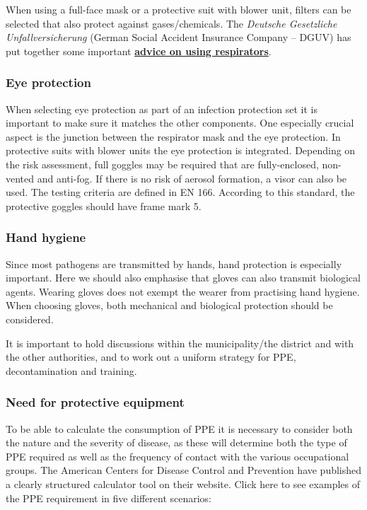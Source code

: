 \documentclass{article}
\begin{document}
When using a full-face mask or a protective suit with blower unit, filters can be selected that also protect against gases/chemicals. The \emph{Deutsche Gesetzliche Unfallversicherung} (German Social Accident Insurance Company – DGUV) has put together some important \textbf{\href{https://publikationen.dguv.de/regelwerk/regeln/1011/benutzung-von-atemschutzgeraeten}{advice on using respirators}}.


\subsubsection{Eye protection}\label{H8706355}



When selecting eye protection as part of an infection protection set it is important to make sure it matches the other components. One especially crucial aspect is the junction between the respirator mask and the eye protection. In protective suits with blower units the eye protection is integrated. Depending on the risk assessment, full goggles may be required that are fully-enclosed, non-vented and anti-fog. If there is no risk of aerosol formation, a visor can also be used. The testing criteria are defined in EN 166. According to this standard, the protective goggles should have frame mark 5.


\subsubsection{Hand hygiene}\label{H3949140}



Since most pathogens are transmitted by hands, hand protection is especially important. Here we should also emphasise that gloves can also transmit biological agents. Wearing gloves does not exempt the wearer from practising hand hygiene. When choosing gloves, both mechanical and biological protection should be considered.


It is important to hold discussions within the municipality/the district and with the other authorities, and to work out a uniform strategy for PPE, decontamination and training.


\subsubsection{Need for protective equipment}\label{H7122370}



To be able to calculate the consumption of PPE it is necessary to consider both the nature and the severity of disease, as these will determine both the type of PPE required as well as the frequency of contact with the various occupational groups. The American Centers for Disease Control and Prevention have published a clearly structured calculator tool on their website. Click here to see examples of the PPE requirement in five different scenarios:
\end{document}
